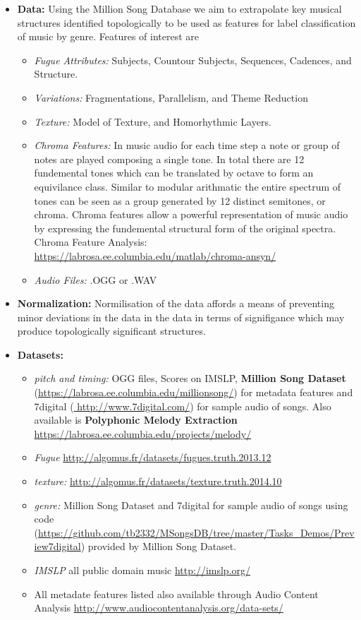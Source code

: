 \documentclass[11pt, a4paper]{article}
\begin{document}
\begin{enumerate}
\begin{itemize}
    \item \textbf{Data:}
      Using the Million Song Database  we aim to extrapolate key musical structures identified topologically to be used as features for label classification of music by genre. Features of interest are
      \begin{itemize}
          \item \textit{Fugue Attributes:} Subjects, Countour Subjects, Sequences, Cadences, and Structure.
          \item \textit{Variations:} Fragmentations, Parallelism, and Theme Reduction
          \item \textit{Texture:} Model of Texture, and Homorhythmic Layers.
          \item \textit{Chroma Features:} In music audio for each time step a note or group of notes are played composing a single tone. In total there are 12 fundemental tones which can be translated by octave to form an equivilance class. Similar to modular arithmatic the entire spectrum of tones can be seen as a group generated by 12 distinct semitones, or chroma. Chroma features allow a powerful representation of music audio by expressing the fundemental structural form of the original spectra. Chroma Feature Analysis: \url{https://labrosa.ee.columbia.edu/matlab/chroma-ansyn/}
          \item \textit{Audio Files:} .OGG or .WAV
      \end{itemize}

    \item \textbf{Normalization:}
      Normilisation of the data affords a means of preventing minor deviations in the data in the data in terms of signifigance which may produce topologically significant structures. 
      
    \item \textbf{Datasets:}
      \begin{itemize}
      \item \textit{pitch and timing:} OGG files, Scores on IMSLP, \textbf{ Million Song Dataset} (\url{https://labrosa.ee.columbia.edu/millionsong/}) for metadata features and 7digital (\url{ http://www.7digital.com/}) for sample audio of songs. Also available is \textbf{Polyphonic Melody Extraction} \url{https://labrosa.ee.columbia.edu/projects/melody/} 
      \item \textit{Fugue} \url{http://algomus.fr/datasets/fugues.truth.2013.12}
      \item \textit{texture:} \url{http://algomus.fr/datasets/texture.truth.2014.10}
      \item \textit{genre:} Million Song Dataset and 7digital for sample audio of songs using code (\url{https://github.com/tb2332/MSongsDB/tree/master/Tasks_Demos/Preview7digital}) provided by Million Song Dataset.
        \item \textit{IMSLP} all public domain music \url{http://imslp.org/}
        \item All metadate features listed also available through Audio Content Analysis \url{http://www.audiocontentanalysis.org/data-sets/}
      \end{itemize}


\end{itemize}
\end{enumerate}
\end{document}
